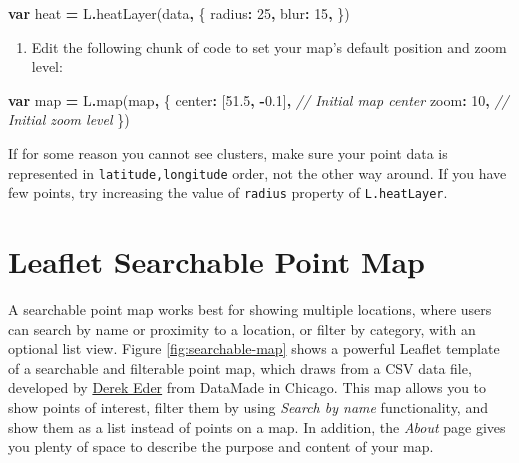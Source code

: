 \documentclass[
  english,
]{book}
\newenvironment{Shaded}{\begin{snugshade}}{\end{snugshade}}
\newcommand{\CommentTok}[1]{\textcolor[rgb]{0.56,0.35,0.01}{\textit{#1}}}
\newcommand{\DataTypeTok}[1]{\textcolor[rgb]{0.13,0.29,0.53}{#1}}
\newcommand{\DecValTok}[1]{\textcolor[rgb]{0.00,0.00,0.81}{#1}}
\newcommand{\FloatTok}[1]{\textcolor[rgb]{0.00,0.00,0.81}{#1}}
\newcommand{\FunctionTok}[1]{\textcolor[rgb]{0.00,0.00,0.00}{#1}}
\newcommand{\KeywordTok}[1]{\textcolor[rgb]{0.13,0.29,0.53}{\textbf{#1}}}
\newcommand{\NormalTok}[1]{#1}
\newcommand{\OperatorTok}[1]{\textcolor[rgb]{0.81,0.36,0.00}{\textbf{#1}}}
\newcommand{\StringTok}[1]{\textcolor[rgb]{0.31,0.60,0.02}{#1}}
\providecommand{\tightlist}{%
  \setlength{\itemsep}{0pt}\setlength{\parskip}{0pt}}
\begin{document}
\begin{Shaded}
\begin{Highlighting}[]
\KeywordTok{var}\NormalTok{ heat }\OperatorTok{=}\NormalTok{ L}\OperatorTok{.}\FunctionTok{heatLayer}\NormalTok{(data}\OperatorTok{,}\NormalTok{ \{}
  \DataTypeTok{radius}\OperatorTok{:} \DecValTok{25}\OperatorTok{,}
  \DataTypeTok{blur}\OperatorTok{:} \DecValTok{15}\OperatorTok{,}
\NormalTok{\})}
\end{Highlighting}
\end{Shaded}

\begin{enumerate}
\def\labelenumi{\arabic{enumi}.}
\setcounter{enumi}{4}
\tightlist
\item
  Edit the following chunk of code to set your map's default position and zoom level:
\end{enumerate}

\begin{Shaded}
\begin{Highlighting}[]
\KeywordTok{var}\NormalTok{ map }\OperatorTok{=}\NormalTok{ L}\OperatorTok{.}\FunctionTok{map}\NormalTok{(}\StringTok{\textquotesingle{}map\textquotesingle{}}\OperatorTok{,}\NormalTok{ \{}
  \DataTypeTok{center}\OperatorTok{:}\NormalTok{ [}\FloatTok{51.5}\OperatorTok{,} \OperatorTok{{-}}\FloatTok{0.1}\NormalTok{]}\OperatorTok{,} \CommentTok{// Initial map center}
  \DataTypeTok{zoom}\OperatorTok{:} \DecValTok{10}\OperatorTok{,} \CommentTok{// Initial zoom level}
\NormalTok{\})}
\end{Highlighting}
\end{Shaded}

If for some reason you cannot see clusters, make sure your point data is represented
in \texttt{latitude,longitude} order, not the other way around. If you have few points,
try increasing the value of \texttt{radius} property of \texttt{L.heatLayer}.

\hypertarget{leaflet-searchable-map}{%
\section*{Leaflet Searchable Point Map}\label{leaflet-searchable-map}}

A searchable point map works best for showing multiple locations, where users can search by name or proximity to a location, or filter by category, with an optional list view. Figure \ref{fig:searchable-map} shows a powerful Leaflet template of a searchable
and filterable point map, which draws from a CSV data file,
developed by \href{https://derekeder.com/}{Derek Eder} from DataMade in Chicago. This map allows
you to show points of interest, filter them by using \emph{Search by name} functionality,
and show them as a list instead of points on a map. In addition, the \emph{About} page
gives you plenty of space to describe the purpose and content of your map.
\end{document}
